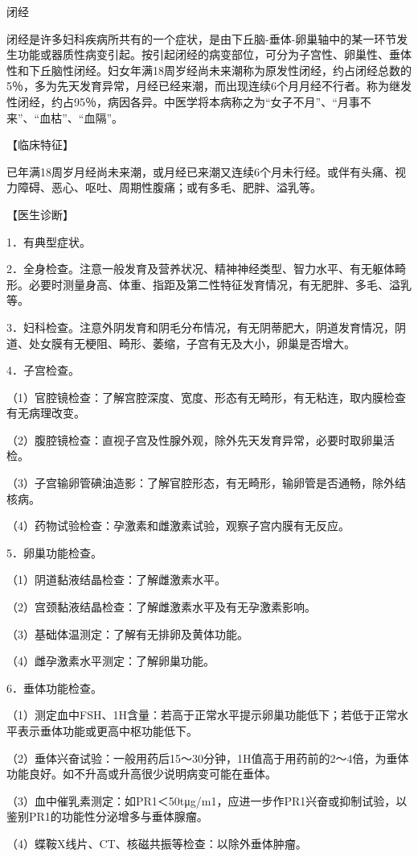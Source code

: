 \documentclass[12pt,UTF8,openany]{ctexbook}
\begin{document}
闭经


闭经是许多妇科疾病所共有的一个症状，是由下丘脑-垂体-卵巢轴中的某一环节发生功能或器质性病变引起。按引起闭经的病变部位，可分为子宫性、卵巢性、垂体性和下丘脑性闭经。妇女年满18周岁经尚未来潮称为原发性闭经，约占闭经总数的5％，多为先天发育异常，月经已经来潮，而出现连续6个月月经不行者。称为继发性闭经，约占95％，病因各异。中医学将本病称之为“女子不月”、“月事不来”、“血枯”、“血隔”。

【临床特征】

已年满18周岁月经尚未来潮，或月经已来潮又连续6个月未行经。或伴有头痛、视力障碍、恶心、呕吐、周期性腹痛；或有多毛、肥胖、溢乳等。

【医生诊断】

1．有典型症状。

2．全身检查。注意一般发育及营养状况、精神神经类型、智力水平、有无躯体畸形。必要时测量身高、体重、指距及第二性特征发育情况，有无肥胖、多毛、溢乳等。

3．妇科检查。注意外阴发育和阴毛分布情况，有无阴蒂肥大，阴道发育情况，阴道、处女膜有无梗阻、畸形、萎缩，子宫有无及大小，卵巢是否增大。

4．子宫检查。

（1）官腔镜检查：了解宫腔深度、宽度、形态有无畸形，有无粘连，取内膜检查有无病理改变。

（2）腹腔镜检查：直视子宫及性腺外观，除外先天发育异常，必要时取卵巢活检。

（3）子宫输卵管碘油造影：了解官腔形态，有无畸形，输卵管是否通畅，除外结核病。

（4）药物试验检查：孕激素和雌激素试验，观察子宫内膜有无反应。

5．卵巢功能检查。

（1）阴道黏液结晶检查：了解雌激素水平。

（2）宫颈黏液结晶检查：了解雌激素水平及有无孕激素影响。

（3）基础体温测定：了解有无排卵及黄体功能。

（4）雌孕激素水平测定：了解卵巢功能。

6．垂体功能检查。

（1）测定血中FSH、1H含量：若高于正常水平提示卵巢功能低下；若低于正常水平表示垂体功能或更高中枢功能低下。

（2）垂体兴奋试验：一般用药后15～30分钟，1H值高于用药前的2～4倍，为垂体功能良好。如不升高或升高很少说明病变可能在垂体。

（3）血中催乳素测定：如PR1＜50tμg/m1，应进一步作PR1兴奋或抑制试验，以鉴别PR1的功能性分泌增多与垂体腺瘤。

（4）蝶鞍X线片、CT、核磁共振等检查：以除外垂体肿瘤。
\end{document}
